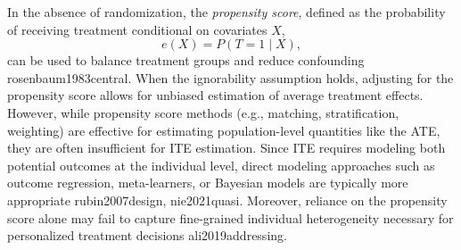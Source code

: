 In the absence of randomization, the \textit{propensity score}, defined as the probability of receiving treatment conditional on covariates $X$,
\begin{equation}
e(X) = P(T = 1 \mid X),
\end{equation}
can be used to balance treatment groups and reduce confounding rosenbaum1983central. When the ignorability assumption holds, adjusting for the propensity score allows for unbiased estimation of average treatment effects. However, while propensity score methods (e.g., matching, stratification, weighting) are effective for estimating population-level quantities like the ATE, they are often insufficient for ITE estimation. Since ITE requires modeling both potential outcomes at the individual level, direct modeling approaches such as outcome regression, meta-learners, or Bayesian models are typically more appropriate rubin2007design, nie2021quasi. Moreover, reliance on the propensity score alone may fail to capture fine-grained individual heterogeneity necessary for personalized treatment decisions ali2019addressing.



